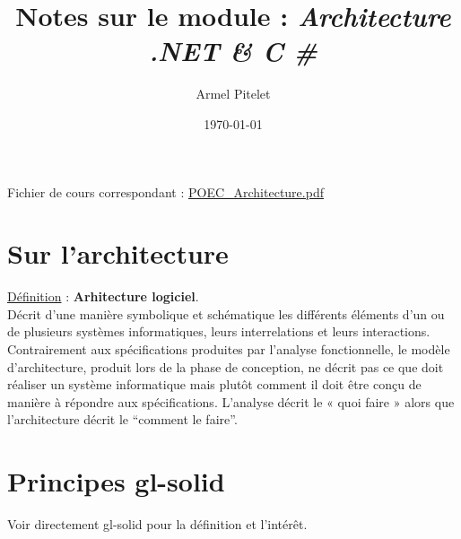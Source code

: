 \documentclass[a4paper,12pt,twoside]{article}
\title{Notes sur le module : \textit{Architecture .NET \& C \#}}
\author{Armel Pitelet}
\date{\today}
\newcommand{\exemplepath}{../Exercices}
\newcommand{\urlcolor}{magenta}  %
\newcommand{\pdfcolor}{red} %
\newcommand{\foldercolor}{orange} %
\newcommand{\cscolor}{green!60!black} %
\newcommand{\slncolor}{violet} %
\newcommand{\defi}[2]{\noindent\underline{Définition} : \textbf{#1}.\\ \indent #2}
\newcommand{\pdfref}[2]{\hypersetup{urlcolor=\pdfcolor}\href{file: #1.pdf}{#2.pdf}\hypersetup{urlcolor=\urlcolor}}
\newcommand{\csref}[2]{\hypersetup{urlcolor=\cscolor}\href{file:\exemplepath /#1.cs}{#2.cs}\hypersetup{urlcolor=\urlcolor}}
\newcommand{\slnref}[2]{\hypersetup{urlcolor=\slncolor}\href{file:\exemplepath /#1.sln}{#2.sln}\hypersetup{urlcolor=\urlcolor}}
\newcommand{\folderref}[2]{\hypersetup{urlcolor=\foldercolor}\href{file:\exemplepath /#1/.}{#2}\hypersetup{urlcolor=\urlcolor}}
\begin{document}
\maketitle
\tableofcontents
\newpage

Fichier de cours correspondant : %
\href{run:../Cours/POEC\_Architecture.pdf}{POEC\_Architecture.pdf} %
\section{Sur l'architecture}

\defi{Arhitecture logiciel}{
Décrit d’une manière symbolique et schématique les différents éléments d’un ou de plusieurs systèmes informatiques, leurs interrelations et leurs interactions. Contrairement aux spécifications produites par l’analyse fonctionnelle, le modèle d'architecture, produit lors de la phase de conception, ne décrit pas ce que doit réaliser un système informatique mais plutôt comment il doit être conçu de manière à répondre aux spécifications. L’analyse décrit le « quoi faire » alors que l’architecture décrit le ``comment le faire''.}

\section{Principes \gls{gl-solid}}
Voir directement \gls{gl-solid} pour la définition et l'intérêt.\\
\end{document}
